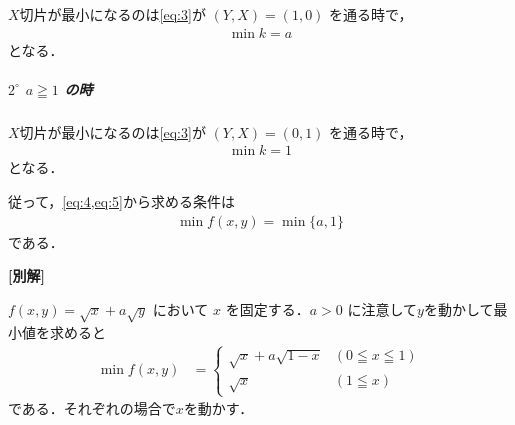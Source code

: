 \documentclass[../../main.tex]{subfiles}
\begin{document}
$X$切片が最小になるのは\cref{eq:3}が $(Y, X) = (1, 0)$ を通る時で，
\begin{align}
  \min k = a \label{eq:4}
\end{align}
となる．

\subparagraph{$2^\circ$ $a \geqq 1$ の時}

$X$切片が最小になるのは\cref{eq:3}が $(Y, X) = (0, 1)$ を通る時で，
\begin{align}
  \min k = 1 \label{eq:5}
\end{align}
となる．
\casesend

従って，\cref{eq:4,eq:5}から求める条件は
\begin{align}
  \min f(x, y) = \min \{a, 1\}
\end{align}
である．

{\bf [別解]}

$f(x, y) = \sqrt{x} + a\sqrt{y}$ において $x$ を固定する．$a > 0$ に注意して$y$を動かして最小値を求めると
\begin{align}
  \min f(x,y) &=
  \begin{cases}
    \sqrt{x} + a\sqrt{1-x} & (0 \leqq x \leqq 1)  \\
    \sqrt{x} & (1 \leqq x)
  \end{cases}
\end{align}
である．それぞれの場合で$x$を動かす．
\end{document}
